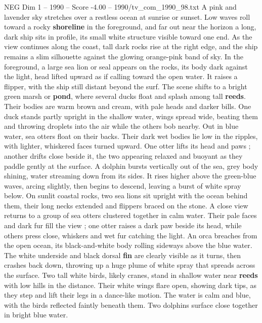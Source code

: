 \begin{textsample}{NEG Dim 1 – 1990 – Score -4.00 – 1990/tv\_com\_1990\_98.txt}  \label{ex:f1_neg_053}
A pink and lavender sky stretches over a restless ocean at sunrise or sunset.
Low waves roll toward a rocky \textbf{shoreline} in the foreground, and far out near the horizon a long, dark ship sits in profile, its small white structure visible toward one end.
As the view continues along the coast, tall dark rocks rise at the right edge, and the ship remains a slim silhouette against the glowing orange-pink band of sky.
In the foreground, a large sea lion or seal appears on the rocks, its body dark against the light, head lifted upward as if calling toward the open water.
It raises a flipper, with the ship still distant beyond the surf.
The scene shifts to a bright green marsh or \textbf{pond}, where several ducks float and splash among tall \textbf{reeds}.
Their bodies are warm brown and cream, with pale heads and darker bills.
One duck stands partly upright in the shallow water, wings spread wide, beating them and throwing droplets into the air while the others bob nearby.
Out in blue water, sea otters float on their backs.
Their dark wet bodies lie low in the ripples, with lighter, whiskered faces turned upward.
One otter lifts its head and paws ; another drifts close beside it, the two appearing relaxed and buoyant as they paddle gently at the surface.
A dolphin bursts vertically out of the sea, grey body shining, water streaming down from its sides.
It rises higher above the green-blue waves, arcing slightly, then begins to descend, leaving a burst of white spray below.
On sunlit coastal rocks, two sea lions sit upright with the ocean behind them, their long necks extended and flippers braced on the stone.
A close view returns to a group of sea otters clustered together in calm water.
Their pale faces and dark fur fill the view ; one otter raises a dark paw beside its head, while others press close, whiskers and wet fur catching the light.
An orca breaches from the open ocean, its black-and-white body rolling sideways above the blue water.
The white underside and black dorsal \textbf{fin} are clearly visible as it turns, then crashes back down, throwing up a huge plume of white spray that spreads across the surface.
Two tall white birds, likely cranes, stand in shallow water near \textbf{reeds} with low hills in the distance.
Their white wings flare open, showing dark tips, as they step and lift their legs in a dance-like motion.
The water is calm and blue, with the birds reflected faintly beneath them.
Two dolphins surface close together in bright blue water.

\end{textsample}
